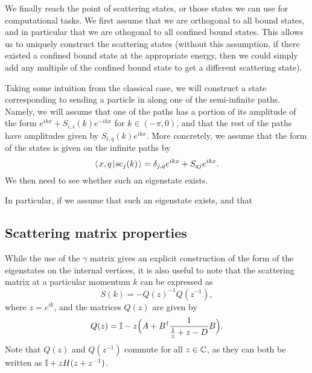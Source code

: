 \documentclass[../thesis-main/thesis-main]{subfiles}
\begin{document}
We finally reach the point of scattering states, or those states we can use for computational tasks.  We first assume that we are orthogonal to all bound states, and in particular that we are othogonal to all confined bound states.  This allows us to uniquely construct the scattering states (without this assumption, if there existed a confined bound state at the appropriate energy, then we could simply add any multiple of the confined bound state to get a different scattering state).

Taking some intuition from the classical case, we will construct a state corresponding to sending a particle in along one of the semi-infinite paths.  Namely, we will assume that one of the paths has a portion of its amplitude of the form $e^{i k x} + S_{i,i}(k)e^{-i k x}$ for $k\in (-\pi, 0)$, and that the rest of the paths have amplitudes given by $S_{i,q}(k)e^{ikx}$.  More concretely, we assume that the form of the states is given on the infinite paths by
\begin{equation}
  \langle\mspace{2mu} x,q \mspace{2mu} | \mspace{2mu} \text{sc}_{j}(k)\mspace{2mu} \rangle = \delta_{j,q} e^{i k x} + S_{qj} e^{i k x}.
\end{equation}
We then need to see whether such an eigenstate exists.

In particular, if we assume that such an eigenstate exists, and that 



\subsection{Scattering matrix properties}

While the use of the $\gamma$ matrix gives an explicit construction of the form of the eigenstates on the internal vertices, it is also useful to note that the scattering matrix at a particular momentum $k$ can be expressed as
\begin{equation}
  S(k) = - Q(z)^{-1} Q(z^{-1}),
\end{equation}
where $z=e^{i k}$, and the matrices $Q(z)$ are given by
\begin{equation}
  Q(z) = \mathbb{I} - z \Big( A + B^\dag \frac{1}{ \frac{1}{z} + z - D} B\Big).
\end{equation}
Note that $Q(z)$ and $Q(z^{-1})$ commute for all $z\in \mathbb{C}$, as they can both be written as $\mathbb{I} + z H(z + z^{-1})$.
\end{document}
